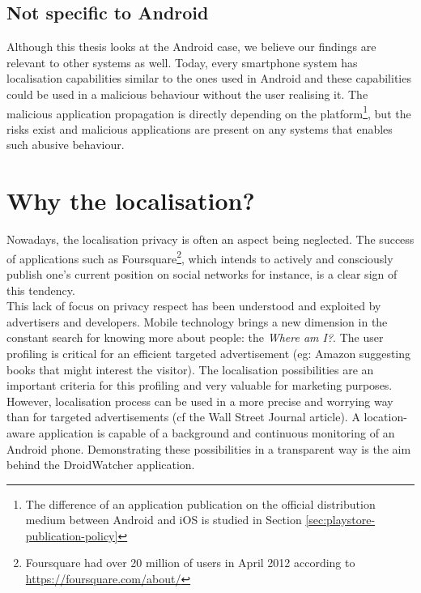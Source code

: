 \subsection*{Not specific to Android}
Although this thesis looks at the Android case, we believe our findings are relevant to other systems as well.
Today, every smartphone system has localisation capabilities similar to the ones used in Android and these capabilities could be used in a malicious behaviour without the user realising it.
The malicious application propagation is directly depending on the platform\footnote{The difference of an application publication on the official distribution medium between Android and iOS is studied in Section \ref{sec:playstore-publication-policy}}, but the risks exist and malicious applications are present on any systems that enables such abusive behaviour.

\section*{Why the localisation?}
\label{sec:why-localisation}

Nowadays, the localisation privacy is often an aspect being neglected.
The success of applications such as Foursquare\footnote{Foursquare had over 20 million of users in April 2012 according to \url{https://foursquare.com/about/}}, which intends to actively and consciously publish one's current position on social networks for instance, is a clear sign of this tendency.\\

This lack of focus on privacy respect has been understood and exploited by advertisers and developers.
Mobile technology brings a new dimension in the constant search for knowing more about people: the \emph{Where am I?}.
The user profiling is critical for an efficient targeted advertisement (eg: Amazon suggesting books that might interest the visitor).
The localisation possibilities are an important criteria for this profiling and very valuable for marketing purposes.\\

However, localisation process can be used in a more precise and worrying way than for targeted advertisements (cf the Wall Street Journal article).
A location-aware application is capable of a background and continuous monitoring of an Android phone.
Demonstrating these possibilities in a transparent way is the aim behind the DroidWatcher application.\\

